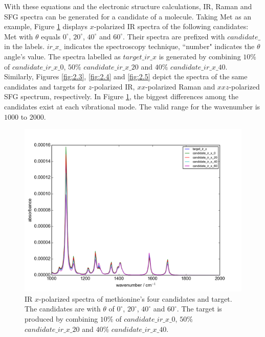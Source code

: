 With these equations and the electronic structure calculations, IR, Raman and SFG spectra can be generated for a candidate of a molecule. Taking Met as an example, Figure \ref{fig:2.2} displays $x$-polarized IR spectra of the following candidates: Met with $\theta$ equals $0^{\circ}$, $20^{\circ}$, $40^{\circ}$ and $60^{\circ}$. Their spectra are prefixed with $candidate\_$ in the labels. $ir\_x\_$ indicates the spectroscopy technique, ``number" indicates the $\theta$ angle's value. The spectra labelled as $target\_ir\_x$ is generated by combining $10\%$ of $candidate\_ir\_x\_0$, $50\%$ $candidate\_ir\_x\_20$ and $40\%$ $candidate\_ir\_x\_40$. \\

Similarly, Figures \ref{fig:2.3}, \ref{fig:2.4} and \ref{fig:2.5} depict the spectra of the same candidates and targets for $z$-polarized IR, $xx$-polarized Raman and $xxz$-polarized SFG spectrum, respectively. In Figure \ref{fig:2.2}, the biggest differences among the candidates exist at each vibrational mode. The valid range for the wavenumber is $1000$ to $2000$. \\

\begin{figure}[!ht]
\centering
\includegraphics[scale=0.5]{Figures/Met_candidates_plotting_ir_x.png}
\caption{IR $x$-polarized spectra of methionine's four candidates and target. The candidates are with $\theta$ of $0^{\circ}$, $20^{\circ}$, $40^{\circ}$ and $60^{\circ}$. The target is produced by combining $10\%$ of $candidate\_ir\_x\_0$, $50\%$ $candidate\_ir\_x\_20$ and $40\%$ $candidate\_ir\_x\_40$. } \label{fig:2.2}
\end{figure}

